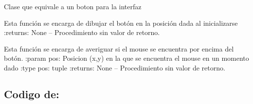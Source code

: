 \documentclass[letterpaper,10pt,english]{sphinxmanual}
\begin{document}
\begin{fulllineitems}
\label{\detokenize{codigo:button.Boton}}
Clase que equivale a un boton para la interfaz

\begin{fulllineitems}
\label{\detokenize{codigo:button.Boton.dibujar}}
Esta función se encarga de dibujar el botón en la posición dada al inicializarse
:returns:  None -- Procedimiento sin valor de retorno.

\end{fulllineitems}


\begin{fulllineitems}
\label{\detokenize{codigo:button.Boton.isOver}}
Esta función se encarga de averiguar si el mouse se encuentra por encima del botón.
:param pos: Posicion (x,y) en la que se encuentra el mouse en un momento dado
:type pos: tuple
:returns:  None -- Procedimiento sin valor de retorno.

\end{fulllineitems}


\end{fulllineitems}



\subsection{Codigo de: }
\label{\detokenize{codigo:module-cargador}}\label{\detokenize{codigo:codigo-de-cargador}}

\begin{fulllineitems}
\label{\detokenize{codigo:cargador.Cargador}}
\end{fulllineitems}
\end{document}
